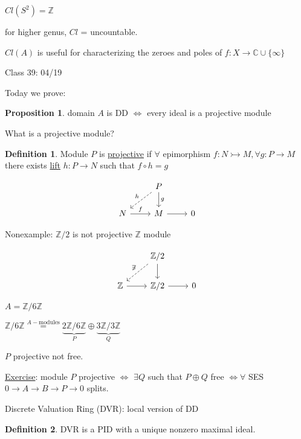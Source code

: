\documentclass{article}
\theoremstyle{definition}
\newtheorem{definition}{Definition}
\newtheorem{proposition}{Proposition}
\begin{document}
\(Cl(S^2)=\mathbb{Z}\)

for higher genus, \(Cl\) = uncountable.

\(Cl(A)\) is useful for characterizing the zeroes and poles of \(f: X \to \mathbb{C} \cup \{ \infty \} \) 

\hrulefill

Class 39: 04/19

Today we prove:

\begin{proposition}
    domain \(A\) is DD \(\iff\) every ideal is a projective module 
\end{proposition}

What is a projective module?

\begin{definition}
    Module \(P\) is \underline{projective} if \(\forall \) epimorphism \(f: N \rightarrowtail M, \forall g : P \to M\) there exists \underline{lift} \(h:P \to N\) such that \(f \circ h = g\)
    
    \[
        \begin{tikzcd}
            & P \ar[dl, dashed, "h", swap] \ar[d, "g"] & \\
            N \ar[r, "f"] & M \ar[r] & 0
        \end{tikzcd}
    \]
\end{definition}

Nonexample: \(\mathbb{Z} / 2\) is not projective \(\mathbb{Z}\) module

\[
    \begin{tikzcd}
        & \mathbb{Z} / 2 \ar[dl, dashed, "\not\exists", swap] \ar[d] & \\
        \mathbb{Z} \ar[r] & \mathbb{Z}/2 \ar[r] & 0
    \end{tikzcd}
\]

\(A = \mathbb{Z} / 6 \mathbb{Z}\) 

\(\mathbb{Z} / 6 \mathbb{Z}  \overset{A-\text{modules}}{=}  \underbrace{2 \mathbb{Z} / 6\mathbb{Z}}_{P} \oplus \underbrace{3\mathbb{Z} / 3\mathbb{Z}}_{Q} \) 

\(P\) projective not free.

\underline{Exercise}: module \(P\) projective \(\iff\) \(\exists Q\) such that \(P \oplus Q\) free \(\iff \forall\) SES \(0 \to A \to B \to P \to 0\) splits.

Discrete Valuation Ring (DVR): local version of DD

\begin{definition}
    DVR is a PID with a unique nonzero maximal ideal.
\end{definition}
\end{document}
